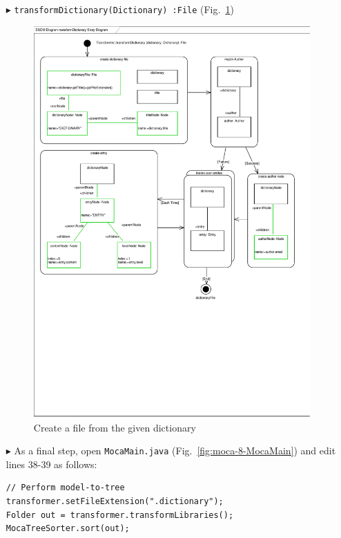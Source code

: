 \begin{enumerate}
\item[$\blacktriangleright$] \texttt{transformDictionary(Dictionary)~:File}
  (Fig.~\ref{fig:moca-transformDictionary})    
\begin{figure}[!htbp]
\begin{center}
 \includegraphics[width=\textwidth]{pics/moca/4ModelToMocaTree/transformDictionary}
  \caption{Create a file from the given dictionary} 
  \label{fig:moca-transformDictionary}
\end{center}
\end{figure} 


\item[$\blacktriangleright$] As a final step, open \texttt{MocaMain.java}
(Fig.~\ref{fig:moca-8-MocaMain}) and edit lines 38-39 as follows:
\begin{verbatim}
// Perform model-to-tree
transformer.setFileExtension(".dictionary");
Folder out = transformer.transformLibraries();
MocaTreeSorter.sort(out);
\end{verbatim}
\end{enumerate}
